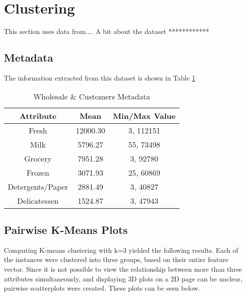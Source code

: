 \documentclass{article}
\begin{document}
\section{Clustering} 

This section uses data from.... 
A bit about the dataset ************

\subsection{Metadata}

\noindent The information extracted from this dataset is shown in Table \ref{table:shopMet}

\vspace{4mm}

\begin{table}
        \centering
        
        \label{table:shopMet}
\begin{tabular}{|c|c|c|}
        \hline
        Attribute & Mean & Min/Max Value\\
        \hline
        Fresh  &  12000.30 & 3, 112151\\
        Milk  &  5796.27 & 55, 73498\\
        Grocery  &  7951.28 & 3, 92780\\
        Frozen  &  3071.93 & 25, 60869\\
        Detergents/Paper  &  2881.49 & 3, 40827\\
        Delicatessen  &  1524.87 & 3, 47943\\
        \hline

\end{tabular}

\caption{Wholesale \& Customers Metadata}


\end{table}


\subsection{Pairwise K-Means Plots}

Computing K-means clustering with k=3 yielded the following results. Each of the instances were clustered into three groups, 
based on their entire feature vector. Since it is not possible to view the relationship between more than three attributes simultaneously,
and displaying 3D plots on a 2D page can be unclear, pairwise scatterplots were created. These plots can be seen below.
\end{document}
